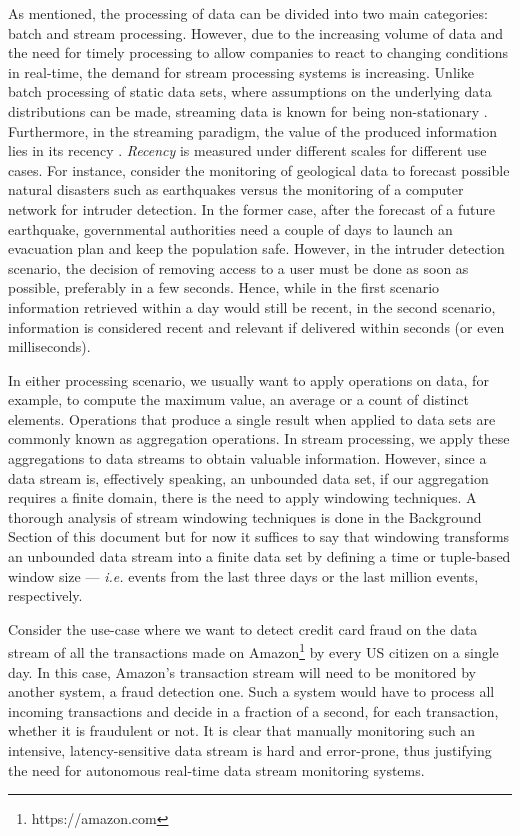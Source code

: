 As mentioned, the processing of data can be divided into two main categories: batch and stream processing. However, due to the increasing volume of data and the need for timely processing to allow companies to react to changing conditions in real-time, the demand for stream processing systems is increasing. Unlike batch processing of static data sets, where assumptions on the underlying data distributions can be made, streaming data is known for being non-stationary \cite{Gama-Knowledge-Discovery}. Furthermore, in the streaming paradigm, the value of the produced information lies in its recency \cite{Kolajo-Big-data-stream-SLR}. \textit{Recency} is measured under different scales for different use cases. For instance, consider the monitoring of geological data to forecast possible natural disasters such as earthquakes versus the monitoring of a computer network for intruder detection. In the former case, after the forecast of a future earthquake, governmental authorities need a couple of days to launch an evacuation plan and keep the population safe. However, in the intruder detection scenario, the decision of removing access to a user must be done as soon as possible, preferably in a few seconds. Hence, while in the first scenario information retrieved within a day would still be recent, in the second scenario, information is considered recent and relevant if delivered within seconds (or even milliseconds).

In either processing scenario, we usually want to apply operations on data, for example, to compute the maximum value, an average or a count of distinct elements. Operations that produce a single result when applied to data sets are commonly known as aggregation operations. In stream processing, we apply these aggregations to data streams to obtain valuable information. However, since a data stream is, effectively speaking, an unbounded data set, if our aggregation requires a finite domain, there is the need to apply windowing techniques. A thorough analysis of stream windowing techniques is done in the Background Section of this document but for now it suffices to say that windowing transforms an unbounded data stream into a finite data set by defining a time or tuple-based window size --- \textit{i.e.} events from the last three days or the last million events, respectively.

Consider the use-case where we want to detect credit card fraud on the data stream of all the transactions made on Amazon\footnote{https://amazon.com} by every US citizen on a single day. In this case, Amazon's transaction stream will need to be monitored by another system, a fraud detection one. Such a system would have to process all incoming transactions and decide in a fraction of a second, for each transaction, whether it is fraudulent or not. It is clear that manually monitoring such an intensive, latency-sensitive data stream is hard and error-prone, thus justifying the need for autonomous real-time data stream monitoring systems.

